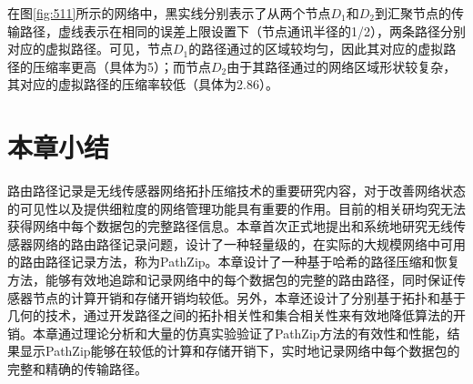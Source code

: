 在图\ref{fig:511}所示的网络中，黑实线分别表示了从两个节点$D_1$和$D_2$到汇聚节点的传输路径，虚线表示在相同的误差上限设置下（节点通讯半径的1/2），两条路径分别对应的虚拟路径。可见，节点$D_1$的路径通过的区域较均匀，因此其对应的虚拟路径的压缩率更高（具体为5）；而节点$D_2$由于其路径通过的网络区域形状较复杂，其对应的虚拟路径的压缩率较低（具体为2.86）。

\section{本章小结}
路由路径记录是无线传感器网络拓扑压缩技术的重要研究内容，对于改善网络状态的可见性以及提供细粒度的网络管理功能具有重要的作用。目前的相关研均究无法获得网络中每个数据包的完整路径信息。本章首次正式地提出和系统地研究无线传感器网络的路由路径记录问题，设计了一种轻量级的，在实际的大规模网络中可用的路由路径记录方法，称为PathZip。本章设计了一种基于哈希的路径压缩和恢复方法，能够有效地追踪和记录网络中的每个数据包的完整的路由路径，同时保证传感器节点的计算开销和存储开销均较低。另外，本章还设计了分别基于拓扑和基于几何的技术，通过开发路径之间的拓扑相关性和集合相关性来有效地降低算法的开销。本章通过理论分析和大量的仿真实验验证了PathZip方法的有效性和性能，结果显示PathZip能够在较低的计算和存储开销下，实时地记录网络中每个数据包的完整和精确的传输路径。
